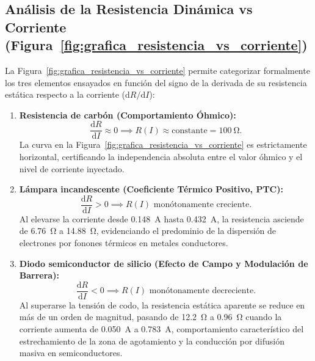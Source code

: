 \subsection{Análisis de la Resistencia Dinámica vs Corriente (Figura~\ref{fig:grafica_resistencia_vs_corriente})}
La Figura~\ref{fig:grafica_resistencia_vs_corriente} permite categorizar formalmente los tres elementos ensayados en función del signo de la derivada de su resistencia estática respecto a la corriente ($\mathrm{d}R/\mathrm{d}I$):
\begin{enumerate}
    \item \textbf{Resistencia de carbón (Comportamiento Óhmico):}
    \begin{equation}
        \frac{\mathrm{d}R}{\mathrm{d}I} \approx 0 \implies R(I) \approx \text{constante} = \qty{100}{\ohm}.
    \end{equation}
    La curva en la Figura~\ref{fig:grafica_resistencia_vs_corriente} es estrictamente horizontal, certificando la independencia absoluta entre el valor óhmico y el nivel de corriente inyectado.
    
    \item \textbf{Lámpara incandescente (Coeficiente Térmico Positivo, PTC):}
    \begin{equation}
        \frac{\mathrm{d}R}{\mathrm{d}I} > 0 \implies R(I) \text{ monótonamente creciente}.
    \end{equation}
    Al elevarse la corriente desde \qty{0,148}{\ampere} hasta \qty{0,432}{\ampere}, la resistencia asciende de \qty{6,76}{\ohm} a \qty{14,88}{\ohm}, evidenciando el predominio de la dispersión de electrones por fonones térmicos en metales conductores.
    
    \item \textbf{Diodo semiconductor de silicio (Efecto de Campo y Modulación de Barrera):}
    \begin{equation}
        \frac{\mathrm{d}R}{\mathrm{d}I} < 0 \implies R(I) \text{ monótonamente decreciente}.
    \end{equation}
    Al superarse la tensión de codo, la resistencia estática aparente se reduce en más de un orden de magnitud, pasando de \qty{12,2}{\ohm} a \qty{0,96}{\ohm} cuando la corriente aumenta de \qty{0,050}{\ampere} a \qty{0,783}{\ampere}, comportamiento característico del estrechamiento de la zona de agotamiento y la conducción por difusión masiva en semiconductores.
\end{enumerate}
